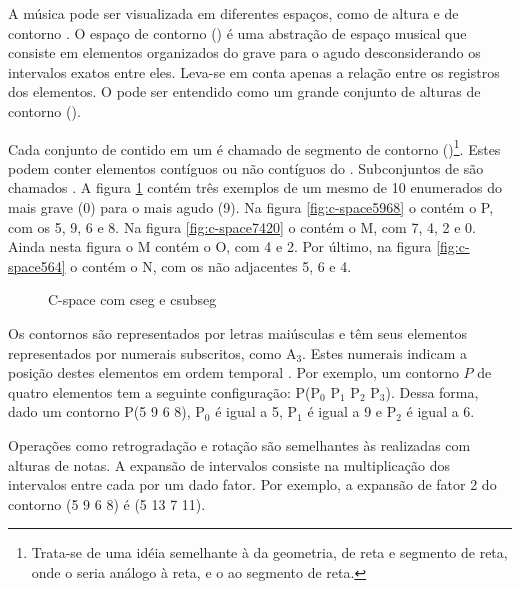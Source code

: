 A música pode ser visualizada em diferentes espaços, como de altura e
de contorno \cite{morris87:composition}. O espaço de contorno
() é uma abstração de espaço musical que consiste em
elementos organizados do grave para o agudo desconsiderando os
intervalos exatos entre eles. Leva-se em conta apenas a relação entre
os registros dos elementos. O  pode ser entendido como um
grande conjunto de alturas de contorno ().

Cada conjunto de  contido em um  é chamado de
segmento de contorno ()\footnote{Trata-se de uma idéia
  semelhante à da geometria, de reta e segmento de reta, onde o
   seria análogo à reta, e o  ao segmento de
  reta.}. Estes  podem conter elementos contíguos ou não
contíguos do . Subconjuntos de  são chamados
. A figura \ref{fig:c-space} contém três exemplos de um
mesmo  de 10  enumerados do mais grave (0)
para o mais agudo (9). Na figura \ref{fig:c-space5968} o 
contém o  P, com os  5, 9, 6 e 8. Na figura
\ref{fig:c-space7420} o  contém o  M, com
 7, 4, 2 e 0. Ainda nesta figura o  M contém o
 O, com  4 e 2. Por último, na figura
\ref{fig:c-space564} o  contém o  N, com os
 não adjacentes 5, 6 e 4.

\begin{figure}
  \centering

  \caption{C-space com cseg e csubseg}
  \label{fig:c-space}
\end{figure}

Os contornos são representados por letras maiúsculas e têm seus
elementos representados por numerais subscritos, como A$_3$. Estes
numerais indicam a posição destes elementos em ordem temporal
\cite{marvin.ea87:relating}. Por exemplo, um contorno $P$ de quatro
elementos tem a seguinte configuração: P(P$_0$ P$_1$ P$_2$
P$_3$). Dessa forma, dado um contorno P(5 9 6 8), P$_0$ é igual a 5,
P$_1$ é igual a 9 e P$_2$ é igual a 6.

Operações como retrogradação e rotação são semelhantes às realizadas
com alturas de notas. A expansão de intervalos consiste na
multiplicação dos intervalos entre cada  por um dado
fator. Por exemplo, a expansão de fator 2 do contorno (5 9 6 8) é (5
13 7 11).


